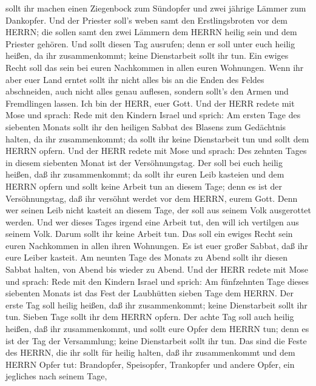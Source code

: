 sollt ihr machen einen Ziegenbock zum Sündopfer und zwei jährige Lämmer
zum Dankopfer.  Und der Priester soll's weben samt den
Erstlingsbroten vor dem HERRN; die sollen samt den zwei Lämmern dem
HERRN heilig sein und dem Priester gehören.  Und sollt
diesen Tag ausrufen; denn er soll unter euch heilig heißen, da ihr
zusammenkommt; keine Dienstarbeit sollt ihr tun. Ein ewiges Recht soll
das sein bei euren Nachkommen in allen euren Wohnungen. 
Wenn ihr aber euer Land erntet sollt ihr nicht alles bis an die Enden
des Feldes abschneiden, auch nicht alles genau auflesen, sondern sollt's
den Armen und Fremdlingen lassen. Ich bin der HERR, euer Gott.
 Und der HERR redete mit Mose und sprach: 
Rede mit den Kindern Israel und sprich: Am ersten Tage des siebenten
Monats sollt ihr den heiligen Sabbat des Blasens zum Gedächtnis halten,
da ihr zusammenkommt;  da sollt ihr keine Dienstarbeit tun
und sollt dem HERRN opfern.  Und der HERR redete mit Mose
und sprach:  Des zehnten Tages in diesem siebenten Monat
ist der Versöhnungstag. Der soll bei euch heilig heißen, daß ihr
zusammenkommt; da sollt ihr euren Leib kasteien und dem HERRN opfern
 und sollt keine Arbeit tun an diesem Tage; denn es ist der
Versöhnungstag, daß ihr versöhnt werdet vor dem HERRN, eurem Gott.
 Denn wer seinen Leib nicht kasteit an diesem Tage, der
soll aus seinem Volk ausgerottet werden.  Und wer dieses
Tages irgend eine Arbeit tut, den will ich vertilgen aus seinem Volk.
 Darum sollt ihr keine Arbeit tun. Das soll ein ewiges
Recht sein euren Nachkommen in allen ihren Wohnungen.  Es
ist euer großer Sabbat, daß ihr eure Leiber kasteit. Am neunten Tage des
Monats zu Abend sollt ihr diesen Sabbat halten, von Abend bis wieder zu
Abend.  Und der HERR redete mit Mose und sprach:
 Rede mit den Kindern Israel und sprich: Am fünfzehnten
Tage dieses siebenten Monats ist das Fest der Laubhütten sieben Tage dem
HERRN.  Der erste Tag soll heilig heißen, daß ihr
zusammenkommt; keine Dienstarbeit sollt ihr tun.  Sieben
Tage sollt ihr dem HERRN opfern. Der achte Tag soll auch heilig heißen,
daß ihr zusammenkommt, und sollt eure Opfer dem HERRN tun; denn es ist
der Tag der Versammlung; keine Dienstarbeit sollt ihr tun. 
Das sind die Feste des HERRN, die ihr sollt für heilig halten, daß ihr
zusammenkommt und dem HERRN Opfer tut: Brandopfer, Speisopfer,
Trankopfer und andere Opfer, ein jegliches nach seinem Tage,
